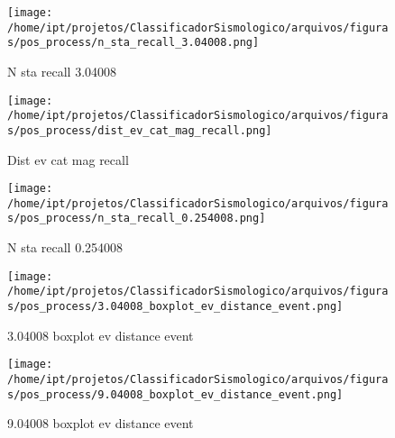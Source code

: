                     \begin{figure}[H]
                        \centering
                        \texttt{[image: /home/ipt/projetos/ClassificadorSismologico/arquivos/figuras/pos\_process/n\_sta\_recall\_3.04008.png]}
                        \caption{N sta recall 3.04008}
                        \label{fig:n_sta_recall_3.04008}
                    \end{figure}
                

                    \begin{figure}[H]
                        \centering
                        \texttt{[image: /home/ipt/projetos/ClassificadorSismologico/arquivos/figuras/pos\_process/dist\_ev\_cat\_mag\_recall.png]}
                        \caption{Dist ev cat mag recall}
                        \label{fig:dist_ev_cat_mag_recall}
                    \end{figure}
                

                    \begin{figure}[H]
                        \centering
                        \texttt{[image: /home/ipt/projetos/ClassificadorSismologico/arquivos/figuras/pos\_process/n\_sta\_recall\_0.254008.png]}
                        \caption{N sta recall 0.254008}
                        \label{fig:n_sta_recall_0.254008}
                    \end{figure}
                

                    \begin{figure}[H]
                        \centering
                        \texttt{[image: /home/ipt/projetos/ClassificadorSismologico/arquivos/figuras/pos\_process/3.04008\_boxplot\_ev\_distance\_event.png]}
                        \caption{3.04008 boxplot ev distance event}
                        \label{fig:3.04008_boxplot_ev_distance_event}
                    \end{figure}
                

                    \begin{figure}[H]
                        \centering
                        \texttt{[image: /home/ipt/projetos/ClassificadorSismologico/arquivos/figuras/pos\_process/9.04008\_boxplot\_ev\_distance\_event.png]}
                        \caption{9.04008 boxplot ev distance event}
                        \label{fig:9.04008_boxplot_ev_distance_event}
                    \end{figure}
                

